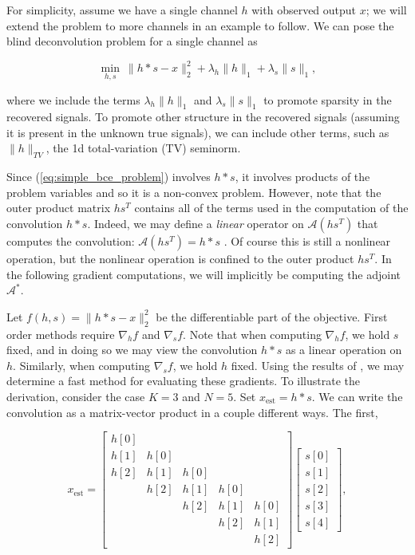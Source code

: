 \documentclass[journal]{IEEEtran}
\begin{document}
For simplicity, assume we have a single channel $h$ with observed output $x$; we will extend the problem to more channels in an example to follow.  We can pose the blind deconvolution problem for a single channel as

\begin{equation}
\label{eq:simple_bce_problem}
\min_{h,s}~ \|h\ast s-x\|_2^2 + \lambda_h\|h\|_1 + \lambda_s \|s\|_1,
\end{equation}

\noindent where we include the terms $\lambda_h\|h\|_1$ and $\lambda_s\|s\|_1$ to promote sparsity in the recovered signals.  To promote other structure in the recovered signals (assuming it is present in the unknown true signals), we can include other terms, such as $\|h\|_{TV}$, the 1d total-variation (TV) seminorm.

Since (\ref{eq:simple_bce_problem}) involves $h\ast s$, it involves products of the problem variables and so it is a non-convex problem.  However, note that the outer product matrix $hs^T$ contains all of the terms used in the computation of the convolution $h\ast s$.  Indeed, we may define a \emph{linear} operator on $\mathcal{A}(hs^T)$ that computes the convolution: $\mathcal{A}(hs^T)=h\ast s$ \cite{ahmed_2013}.  Of course this is still a nonlinear operation, but the nonlinear operation is confined to the outer product $hs^T$.  In the following gradient computations, we will implicitly be computing the adjoint $\mathcal{A}^\ast$.

Let $f(h,s)=\|h\ast s -x\|_2^2$ be the differentiable part of the objective.  First order methods require $\nabla_hf$ and $\nabla_sf$.  Note that when computing $\nabla_hf$, we hold $s$ fixed, and in doing so we may view the convolution $h\ast s$ as a linear operation on $h$.  Similarly, when computing $\nabla_s f$, we hold $h$ fixed.  Using the results of \cite{claerbout_1992}, we may determine a fast method for evaluating these gradients.  To illustrate the derivation, consider the case $K=3$ and $N=5$.  Set $x_\text{est}=h\ast s$.  We can write the convolution as a matrix-vector product in a couple different ways.  The first,

\[ x_\text{est} = \begin{bmatrix} h[0]\\h[1]&h[0]\\h[2]&h[1]&h[0]\\&h[2]&h[1]&h[0]\\&&h[2]&h[1]&h[0]\\&&&h[2]&h[1]\\&&&&h[2]\end{bmatrix}\begin{bmatrix}s[0]\\s[1]\\s[2]\\s[3]\\s[4]\end{bmatrix}, \] 
\end{document}
